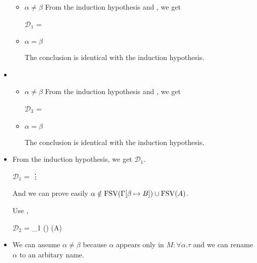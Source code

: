 \begin{itemize}
	      \begin{itemize}

		      \item $\alpha \neq \beta$
		            From the induction hypothesis and \TTB, we get

		            $\mathcal{D}_1$ = 
		            {}

		      \item $\alpha = \beta$

		            The conclusion is identical with the induction hypothesis.

	      \end{itemize}

	\item \TTBL

	      \begin{itemize}

		      \item $\alpha \neq \beta$
		            From the induction hypothesis and \TTBL, we get

		            $\mathcal{D}_3$ = 
		            {
		            }

		      \item $\alpha = \beta$

		            The conclusion is identical with the induction hypothesis.

	      \end{itemize}

	\item \TGen

	      From the induction hypothesis, we get $\mathcal{D}_1$.

	      $\mathcal{D}_1$ = 
	      {\vdots}

	      And we can prove easily $\alpha \notin \text{FSV}(\Gamma[\beta \mapsto B]) \cup \text{FSV}(A)$.

	      Use \TGen,

	      $\mathcal{D}_2$ = 
	      {_1 \andalso \alpha \notin \FTV(\GG) \cup \FTV(A)}

	\item \TIns

	      We can assume $\alpha \neq \beta$ because $\alpha$ appears only in $M:\forall\alpha.\tau$ and we can rename $\alpha$ to an arbitary name.


\end{itemize}
